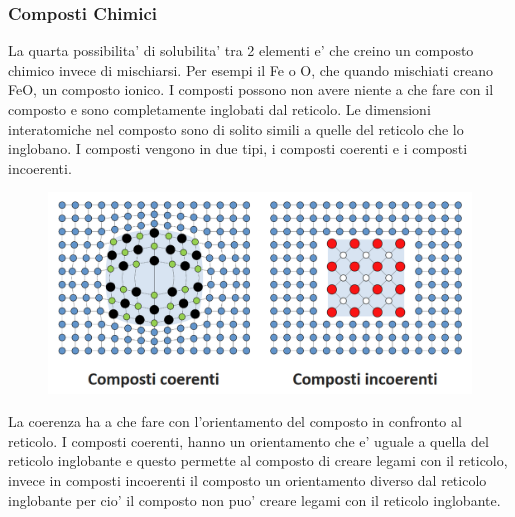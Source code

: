 \documentclass{article}
\begin{document}
        \subsubsection{Composti Chimici}
            La quarta possibilita' di solubilita' tra 2 elementi e' che creino un composto chimico invece di mischiarsi.
            Per esempi il Fe o O, che quando mischiati creano FeO, un composto ionico.
            I composti possono non avere niente a che fare con il composto e sono completamente inglobati dal reticolo. 
            Le dimensioni interatomiche nel composto sono di solito simili a quelle del reticolo che lo inglobano.
            \newline \newline I composti vengono in due tipi, i composti coerenti e i composti incoerenti.
            \begin{figure}
                \centering
                \includegraphics[width=.85\linewidth]{Tipi di Composti.png}
            \end{figure}
            La coerenza ha a che fare con l'orientamento del composto in confronto al reticolo. I composti coerenti, hanno un orientamento che e' uguale a quella del 
            reticolo inglobante e questo permette al composto di creare legami con il reticolo, invece in composti incoerenti il composto un orientamento diverso dal 
            reticolo inglobante per cio' il composto non puo' creare legami con il reticolo inglobante.



                

                
                
\end{document}
